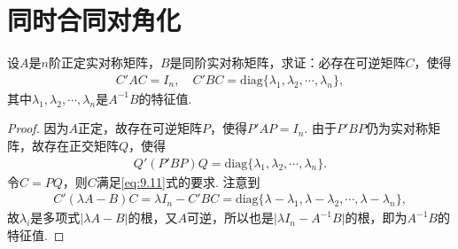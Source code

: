 \documentclass[../../main.tex]{subfiles}%
\begin{document}
\section{同时合同对角化}

\begin{proposition}[同时合同对角化]\label{proposition:例9.75}
设\(A\)是\(n\)阶正定实对称矩阵，\(B\)是同阶实对称矩阵，求证：必存在可逆矩阵\(C\)，使得
\begin{align}
C'AC = I_n,\quad C'BC = \mathrm{diag}\{\lambda_1,\lambda_2,\cdots,\lambda_n\},\label{eq:9.11}
\end{align}
其中\(\lambda_1,\lambda_2,\cdots,\lambda_n\)是\(A^{-1}B\)的特征值.
\end{proposition}
\begin{proof}
因为\(A\)正定，故存在可逆矩阵\(P\)，使得\(P'AP = I_n\). 由于\(P'BP\)仍为实对称矩阵，故存在正交矩阵\(Q\)，使得
\begin{align*}
Q'(P'BP)Q = \mathrm{diag}\{\lambda_1,\lambda_2,\cdots,\lambda_n\}.
\end{align*}
令\(C = PQ\)，则\(C\)满足\eqref{eq:9.11}式的要求. 注意到
\begin{align*}
C'(\lambda A - B)C=\lambda I_n - C'BC = \mathrm{diag}\{\lambda - \lambda_1,\lambda - \lambda_2,\cdots,\lambda - \lambda_n\},
\end{align*}
故\(\lambda_i\)是多项式\(\vert\lambda A - B\vert\)的根，又\(A\)可逆，所以也是\(\vert\lambda I_n - A^{-1}B\vert\)的根，即为\(A^{-1}B\)的特征值. 
\end{proof}
\end{document}
